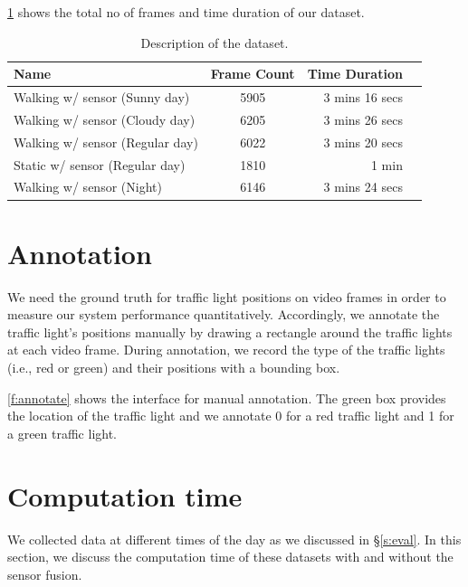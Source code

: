 \ref{t:dataset} shows the total no of frames and time duration of our dataset.

\begin{table}[ht!]
  \centering
  \caption{Description of the dataset.}
  \label{t:dataset}
  \begin{tabular}{  l  c  r r }
    \rowcolor{gray!50}
    Name & Frame Count & Time Duration \\
    \hline
    Walking w/ sensor (Sunny day) & 5905 & 3 mins 16 secs \\
    Walking w/ sensor (Cloudy day) & 6205 & 3 mins 26 secs \\ %
    Walking w/ sensor (Regular day) & 6022 & 3 mins 20 secs \\%
    Static w/ sensor (Regular day) & 1810 & 1 min \\%
    Walking w/ sensor (Night) & 6146 & 3 mins 24 secs \\
    \hline
  \end{tabular}
\end{table}

\section{Annotation}
We need the ground truth for traffic light positions on video frames in order to measure our system performance quantitatively.
Accordingly, we annotate the traffic light's positions manually by drawing a rectangle around the traffic lights at each video frame.
During annotation, we record the type of the traffic lights (i.e., red or green) and their positions with a bounding box.

\ref{f:annotate} shows the interface for manual annotation.
The green box provides the location of the traffic light and we annotate 0 for a red traffic light and 1 for a green traffic light.




\section{Computation time}
We collected data at different times of the day as we discussed in \S\ref{s:eval}.
In this section, we discuss the computation time of these datasets with and without the sensor fusion.

